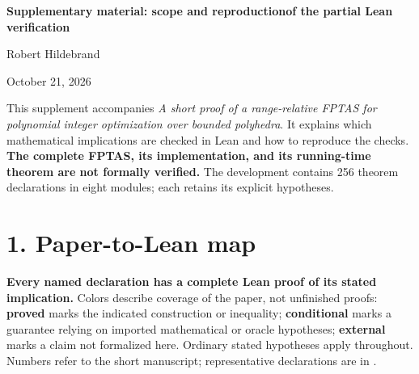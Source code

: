 \documentclass[10pt]{article}
\newcommand{\proved}[1]{\textcolor{proved}{\textbf{#1}}}
\newcommand{\conditional}[1]{\textcolor{conditional}{\textbf{#1}}}
\newcommand{\external}[1]{\textcolor{external}{\textbf{#1}}}
\newcommand{\id}[1]{\texttt{\detokenize{#1}}}
\begin{document}
\begin{center}
{\Large\bfseries Supplementary material: scope and reproduction\newline of the partial Lean verification}\par
Robert Hildebrand\par
October 21, 2026
\end{center}
This supplement accompanies \emph{A short proof of a range-relative FPTAS for polynomial integer optimization over bounded polyhedra}. It explains which mathematical implications are checked in Lean and how to reproduce the checks. \textbf{The complete FPTAS, its implementation, and its running-time theorem are not formally verified.} The development contains 256 theorem declarations in eight modules; each retains its explicit hypotheses.

\section*{1. Paper-to-Lean map}
\textbf{Every named declaration has a complete Lean proof of its stated implication.} Colors describe coverage of the paper, not unfinished proofs:
\proved{proved} marks the indicated construction or inequality;
\conditional{conditional} marks a guarantee relying on imported mathematical or oracle hypotheses;
\external{external} marks a claim not formalized here. Ordinary stated hypotheses apply throughout. Numbers refer to the short manuscript; representative declarations are in \id{verification/lean/}.
\end{document}
